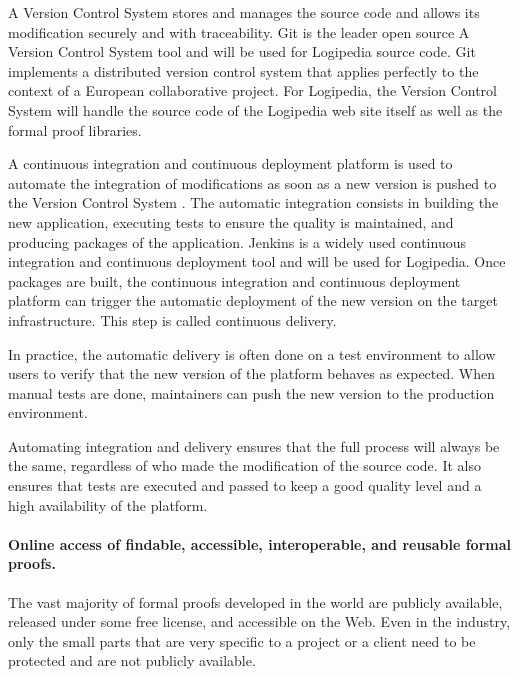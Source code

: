 \begin{compactitem}
\item
A Version Control System stores and manages the source code and
allows its modification securely and with traceability. Git is the leader
open source
A Version Control System 
tool and will be used for Logipedia source code. Git implements
a distributed version control system that applies perfectly to the context of
a European collaborative project. For Logipedia, the Version Control System  will handle the
source code of the Logipedia web site itself as well as the formal proof libraries.
\item
A
continuous integration and continuous deployment
platform is used to automate the integration of modifications
as soon as a new version is pushed to the Version Control System . The automatic integration
consists in building the new application, executing tests to ensure
the quality is maintained, and producing packages of the application.
Jenkins is a widely used
continuous integration and continuous deployment
tool and will be used for Logipedia.
Once packages are built, the
continuous integration and continuous deployment
platform can trigger the automatic
deployment of the new version on the target infrastructure.
This step is called continuous delivery.
\end{compactitem}

In practice, the automatic delivery is often done on a test environment
to allow users to verify that the new version of the platform
behaves as expected. When manual tests are done, maintainers can push
the new version to the production environment.

Automating integration and delivery ensures that the full process
will always be the same, regardless of who made the modification
of the source code. It also ensures that tests are executed and passed
to keep a good quality level and a high availability of the platform.

\paragraph*{Online access of findable, accessible, interoperable, and
reusable formal proofs.}

The vast majority of formal proofs developed in the world are publicly
available, released under some free license, and accessible on the
Web. Even in the industry, only the small parts that are very specific
to a project or a client need to be protected and are not publicly
available.

